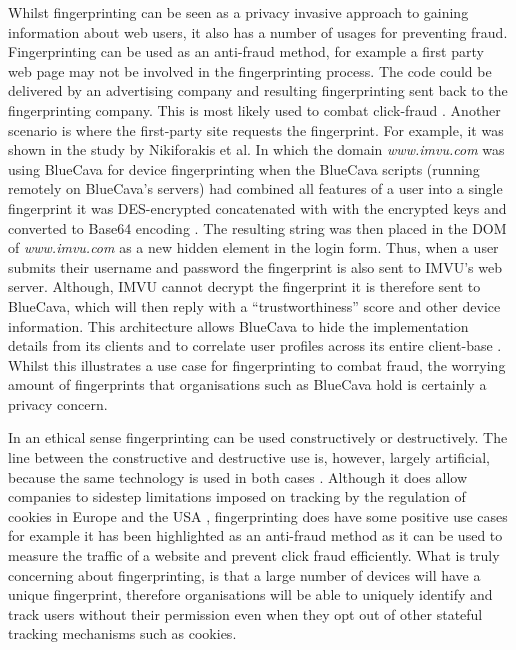 \documentclass{article}
\begin{document}
Whilst fingerprinting can be seen as a privacy invasive approach to gaining information about web users, it also has a number of usages for preventing fraud.  Fingerprinting can be used as an anti-fraud method, for example a first party web page may not be involved in the fingerprinting process. The code could be delivered by an advertising company and resulting fingerprinting sent back to the fingerprinting company. This is most likely used to combat click-fraud \parencite{cookielessMonster}. Another scenario is where the first-party site requests the fingerprint. For example, it was shown in the study by Nikiforakis et al. In which the domain \textit{www.imvu.com} was using BlueCava for device fingerprinting when the BlueCava scripts (running remotely on BlueCava's servers) had combined all features of a user into a single fingerprint it was DES-encrypted concatenated with with the encrypted keys and converted to Base64 encoding \parencite{cookielessMonster}. The resulting string was then placed in the DOM of \textit{www.imvu.com} as a new hidden element in the login form. Thus, when a user submits their username and password the fingerprint is also sent to IMVU's web server. Although, IMVU cannot decrypt the fingerprint it is therefore sent to BlueCava, which will then reply with a “trustworthiness” score and other device information. This architecture allows BlueCava to hide the implementation details from its clients and to correlate user profiles across its entire client-base \parencite{cookielessMonster}. Whilst this illustrates a use case for fingerprinting to combat fraud, the worrying amount of fingerprints that organisations such as BlueCava hold is certainly a privacy concern.   

In an ethical sense fingerprinting can be used constructively or destructively. The line between the constructive and destructive use is, however, largely artificial, because the same technology is used in both cases \parencite{cookielessMonster}. Although it does allow companies to sidestep limitations imposed on tracking by the regulation of cookies in Europe and the USA \parencite{dustingFP}, fingerprinting does have some positive use cases for example it has been highlighted as an anti-fraud method as it can be used to measure the traffic of a website and prevent click fraud efficiently. What is truly concerning about fingerprinting, is that a large number of devices will have a unique fingerprint, therefore organisations will be able to uniquely identify and track users without their permission even when they opt out of other stateful tracking mechanisms such as cookies. 
\end{document}
